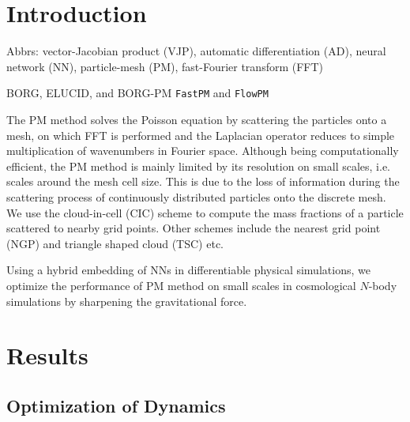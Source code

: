 \documentclass[modern, trackchanges, dvipsnames]{aastex631}
\begin{document}
\vspace{1em}
\section{Introduction}

Abbrs: vector-Jacobian product (VJP), automatic differentiation (AD), neural
network (NN), particle-mesh (PM), fast-Fourier transform (FFT)


BORG, ELUCID, and BORG-PM \citep{BORG, ELUCID, BORG-PM}
\texttt{FastPM} and \texttt{FlowPM} \citep{FastPM, vmad, SeljakEtAl2017, FlowPM}


The PM method solves the Poisson equation by scattering the particles onto a
mesh, on which FFT is performed and the Laplacian operator reduces to simple
multiplication of wavenumbers in Fourier space.
Although being computationally efficient, the PM method is mainly limited by its
resolution on small scales, i.e. scales around the mesh cell size.
This is due to the loss of information during the scattering process of
continuously distributed particles onto the discrete mesh.
We use the cloud-in-cell (CIC) scheme \citep{HockneyEastwood1988} to compute the
mass fractions of a particle scattered to nearby grid points.
Other schemes include the nearest grid point (NGP) and triangle shaped cloud
(TSC) etc.

Using a hybrid embedding of NNs in differentiable physical simulations, we
optimize the performance of PM method on small scales in cosmological $N$-body
simulations by sharpening the gravitational force.


\vspace{1em}
\section{Results}

\subsection{Optimization of Dynamics}
\end{document}
